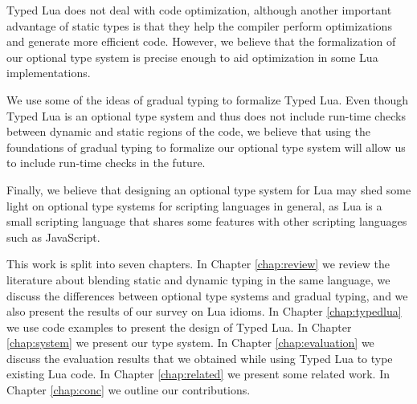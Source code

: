 Typed Lua does not deal with code optimization, although another
important advantage of static types is that they help the compiler
perform optimizations and generate more efficient code.
However, we believe that the formalization of our optional type
system is precise enough to aid optimization in some Lua implementations.

We use some of the ideas of gradual typing to formalize Typed Lua.
Even though Typed Lua is an optional type system and thus does not
include run-time checks between dynamic and static regions of the
code, we believe that using the foundations of gradual typing to
formalize our optional type system will allow us to include run-time
checks in the future.

Finally, we believe that designing an optional type system for Lua may
shed some light on optional type systems for scripting languages
in general, as Lua is a small scripting language that shares
some features with other scripting languages such as JavaScript.

This work is split into seven chapters.
In Chapter \ref{chap:review} we review the literature about blending
static and dynamic typing in the same language, we discuss the differences
between optional type systems and gradual typing, and we also
present the results of our survey on Lua idioms.
In Chapter \ref{chap:typedlua} we use code examples to present the
design of Typed Lua.
In Chapter \ref{chap:system} we present our type system.
In Chapter \ref{chap:evaluation} we discuss the evaluation
results that we obtained while using Typed Lua to type existing Lua code.
In Chapter \ref{chap:related} we present some related work.
In Chapter \ref{chap:conc} we outline our contributions.

